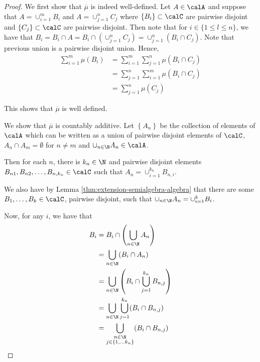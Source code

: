 \begin{proof}
    We first show that $\overline \mu$ is indeed well-defined. Let $A\in \calA$ and suppose that $A= \cup_{i=1}^{m} B_i$ and $A=\cup_{j=1}^{n} C_j$ where  $\left\{ B_i \right\} \subset \calC$ are pairwise disjoint and $\left\{ C_j \right\} \subset \calC$ are pairwise disjoint. Then note that for $i \in \{1\le l \le n\}$, we have that $B_i = B_i \cap A = B_i \cap \left(\cup_{j=1}^{n} C_j\right) = \cup_{j=1}^{n} (B_i \cap C_j)$. Note that previous union is a pairwise disjoint union. Hence,
    \begin{align*}
	\sum_{i=1}^{m} \mu (B_i ) &= \sum_{i=1}^{m} \sum_{j=1}^{n} \mu(B_i \cap C_j) \\
	&= \sum_{j=1}^{n} \sum_{i=1}^{m} \mu(B_i \cap C_j) \\
	&= \sum_{j=1}^{n} \mu (C_j)
    \end{align*}

    This shows that $\overline \mu$ is well defined.

    We show that $\overline \mu $ is countably additive. Let $\left\{ A_n \right\}$ be the collection of elements of $\calA$ which can be written as a union of pairwise disjoint elements of $\calC$, $A_n \cap A_m = \emptyset$ for $n\ne m$ and $\cup_{n\in \N} A_n \in \calA$.

    Then for each $n$, there is $k_n \in \N$ and pairwise disjoint elements $B_{n1} , B_{n2} , \ldots , B_{n,k_n} \in \calC$ such that $A_n = \cup_{i=1}^{k_n} B_{n,i}$.

    We also have by Lemma \ref{thm:extension-semialgebra-algebra} that there are some $B_1 , \ldots , B_k \in\calC$, pairwise disjoint, such that $\cup_{n\in \N} A_n = \cup_{i=1}^{k} B_i$. 

    Now, for any $i$, we have that 
    \begin{align*}
	B_i &= B_i \cap \left( \bigcup_{n\in\N} A_n \right) \\
	&= \bigcup_{n\in \N} (B_i \cap A_n) \\
	&= \bigcup_{n\in \N} \left( B_i \cap \bigcup_{j=1}^{k_n} B_{n,j} \right) \\
	&= \bigcup_{n\in \N} \bigcup_{j=1}^{k_n} (B_i \cap B_{n,j}) \\
	&= \bigcup_{\substack{n\in \N \\ j\in \left\{ 1, \ldots k_n \right\}}} (B_i \cap B_{n,j}) 
    \end{align*}


\end{proof}
